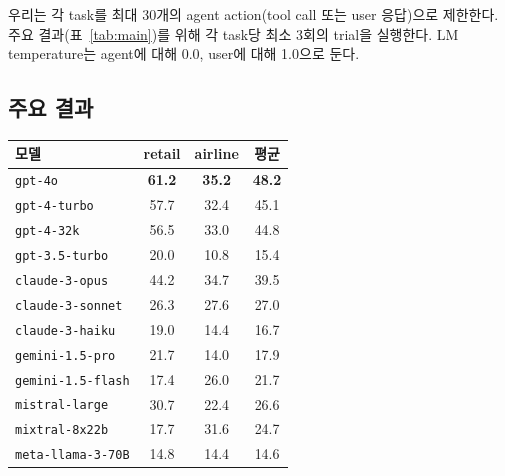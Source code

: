 \documentclass{article}
\begin{document}
우리는 각 task를 최대 30개의 agent action(tool call 또는 user 응답)으로 제한한다. 주요 결과(표~\ref{tab:main})를 위해 각 task당 최소 3회의 trial을 실행한다.
LM temperature는 agent에 대해 0.0, user에 대해 1.0으로 둔다.


\subsection{주요 결과}
\label{sec:results}



\begin{table}[t]
\centering
\begin{minipage}[t]{0.47\textwidth}
    \vspace{0pt} %

    \centering

        \small
    \begin{tabular}{l|cc|c}
    \toprule
      모델  & retail & airline & 평균\\
       \midrule
       \texttt{gpt-4o}  & {\color{black}\textbf{61.2}} & {\color{black}\textbf{35.2}} & \textbf{48.2} \\
       \texttt{gpt-4-turbo} & 57.7 & 32.4 & 45.1 \\
       \texttt{gpt-4-32k} & 56.5 & 33.0 & 44.8 \\
        \texttt{gpt-3.5-turbo} & 20.0 & 10.8 & 15.4 \\
        \midrule
       \texttt{claude-3-opus} & {44.2} & 34.7 & 39.5 \\
       \texttt{claude-3-sonnet} & 26.3 & 27.6 & 27.0 \\
       \texttt{claude-3-haiku} & 19.0 & 14.4 & 16.7 \\
       \midrule
       \texttt{gemini-1.5-pro} & {21.7} & 14.0 & 17.9 \\
       \texttt{gemini-1.5-flash} & 17.4 & 26.0 & 21.7 \\
       \midrule
        \texttt{mistral-large} & {30.7} & 22.4 & 26.6 \\
       \texttt{mixtral-8x22b} & 17.7 & 31.6 & 24.7 \\ %
        \midrule
       \texttt{meta-llama-3-70B} & 14.8 & 14.4 & 14.6 \\ %
       \bottomrule
    \end{tabular}
\vspace{10pt}

\end{minipage}
\end{table}
\end{document}
